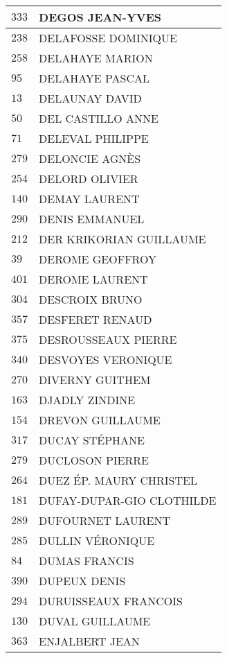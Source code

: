 \begin{xltabular}{\linewidth}{|l|X|}
    \hline
    $333$ & DEGOS JEAN-YVES \\
    \hline
    $238$ & DELAFOSSE DOMINIQUE \\
    \hline
    $258$ & DELAHAYE MARION \\
    \hline
    $95$ & DELAHAYE PASCAL \\
    \hline
    $13$ & DELAUNAY DAVID \\
    \hline
    $50$ & DEL CASTILLO ANNE \\
    \hline
    $71$ & DELEVAL PHILIPPE \\
    \hline
    $279$ & DELONCIE AGNÈS \\
    \hline
    $254$ & DELORD OLIVIER \\
    \hline
    $140$ & DEMAY LAURENT \\
    \hline
    $290$ & DENIS EMMANUEL \\
    \hline
    $212$ & DER KRIKORIAN GUILLAUME \\
    \hline
    $39$ & DEROME GEOFFROY \\
    \hline
    $401$ & DEROME LAURENT \\
    \hline
    $304$ & DESCROIX BRUNO \\
    \hline
    $357$ & DESFERET RENAUD \\
    \hline
    $375$ & DESROUSSEAUX PIERRE \\
    \hline
    $340$ & DESVOYES VERONIQUE \\
    \hline
    $270$ & DIVERNY GUITHEM \\
    \hline
    $163$ & DJADLY ZINDINE \\
    \hline
    $154$ & DREVON GUILLAUME \\
    \hline
    $317$ & DUCAY STÉPHANE \\
    \hline
    $279$ & DUCLOSON PIERRE \\
    \hline
    $264$ & DUEZ ÉP. MAURY CHRISTEL \\
    \hline
    $181$ & DUFAY-DUPAR-GIO CLOTHILDE \\
    \hline
    $289$ & DUFOURNET LAURENT \\
    \hline
    $285$ & DULLIN VÉRONIQUE \\
    \hline
    $84$ & DUMAS FRANCIS \\
    \hline
    $390$ & DUPEUX DENIS \\
    \hline
    $294$ & DURUISSEAUX FRANCOIS \\
    \hline
    $130$ & DUVAL GUILLAUME \\
    \hline
    $363$ & ENJALBERT JEAN \\

\end{xltabular}
